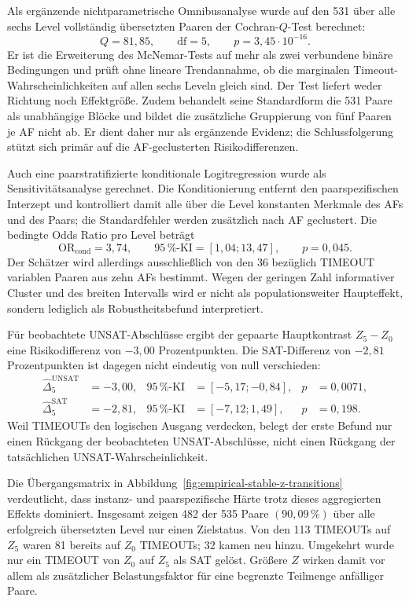 Als ergänzende nichtparametrische Omnibusanalyse wurde auf den 531 über
alle sechs Level vollständig übersetzten Paaren der Cochran-\(Q\)-Test
berechnet:
\[
    Q=81{,}85,\qquad \mathrm{df}=5,\qquad
    p=3{,}45\cdot10^{-16}.
\]
Er ist die
Erweiterung des McNemar-Tests auf mehr als zwei verbundene binäre
Bedingungen und prüft ohne lineare Trendannahme, ob die marginalen
Timeout-Wahrscheinlichkeiten auf allen sechs Leveln gleich sind. Der Test
liefert weder Richtung noch Effektgröße. Zudem behandelt seine Standardform
die 531 Paare als unabhängige Blöcke und bildet die zusätzliche Gruppierung
von fünf Paaren je AF nicht ab. Er dient daher nur als ergänzende Evidenz;
die Schlussfolgerung stützt sich primär auf die AF-geclusterten
Risikodifferenzen.

Auch eine paarstratifizierte konditionale Logitregression wurde als
Sensitivitätsanalyse gerechnet. Die Konditionierung entfernt den
paarspezifischen Interzept und kontrolliert damit alle über die Level
konstanten Merkmale des AFs und des Paars; die Standardfehler werden
zusätzlich nach AF geclustert. Die bedingte Odds Ratio pro Level beträgt
\[
    \mathrm{OR}_{\mathrm{cond}}=3{,}74,\qquad
    95\,\%\text{-KI}=[1{,}04;13{,}47],\qquad p=0{,}045.
\]
Der
Schätzer wird allerdings ausschließlich von den 36 bezüglich TIMEOUT
variablen Paaren aus zehn AFs bestimmt. Wegen der geringen Zahl informativer
Cluster und des breiten Intervalls wird er nicht als populationsweiter
Haupteffekt, sondern lediglich als Robustheitsbefund interpretiert.

Für beobachtete UNSAT-Abschlüsse ergibt der gepaarte Hauptkontrast
\(Z_5-Z_0\) eine Risikodifferenz von \(-3{,}00\) Prozentpunkten. Die
SAT-Differenz von \(-2{,}81\) Prozentpunkten ist dagegen nicht eindeutig
von null verschieden:
\begin{align*}
    \widehat{\Delta}^{\mathrm{UNSAT}}_5
        &=-3{,}00,
        &95\,\%\text{-KI}&=[-5{,}17;-0{,}84],
        &p&=0{,}0071,\\
    \widehat{\Delta}^{\mathrm{SAT}}_5
        &=-2{,}81,
        &95\,\%\text{-KI}&=[-7{,}12;1{,}49],
        &p&=0{,}198.
\end{align*}
Weil
TIMEOUTs den logischen Ausgang verdecken, belegt der erste Befund nur einen
Rückgang der beobachteten UNSAT-Abschlüsse, nicht einen Rückgang der
tatsächlichen UNSAT-Wahrscheinlichkeit.

Die Übergangsmatrix in
Abbildung~\ref{fig:empirical-stable-z-transitions} verdeutlicht, dass
instanz- und paarspezifische Härte trotz dieses aggregierten Effekts
dominiert. Insgesamt zeigen 482 der 535 Paare
\((90{,}09\,\%)\) über alle erfolgreich übersetzten Level nur einen
Zielstatus. Von den 113 TIMEOUTs auf \(Z_5\) waren 81 bereits auf \(Z_0\)
TIMEOUTs; 32 kamen neu hinzu. Umgekehrt wurde nur ein TIMEOUT von \(Z_0\)
auf \(Z_5\) als SAT gelöst. Größere \(Z\) wirken damit vor allem als
zusätzlicher Belastungsfaktor für eine begrenzte Teilmenge anfälliger Paare.

